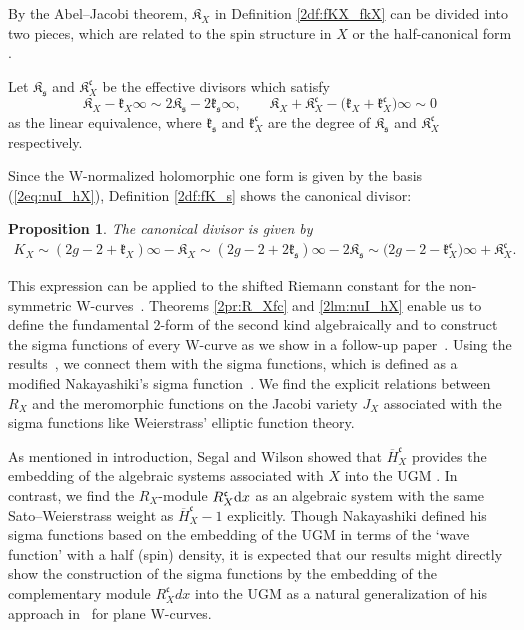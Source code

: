 \documentclass[pdftex]{sigma}
\def\fK{{\mathfrak K}}
\def\fc{{\mathfrak c}}
\def\fk{{\mathfrak k}}
\def\fs{{\mathfrak s}}
\def\BH{{\overline H}}
\numberwithin{equation}{section}
\newtheorem{Proposition}[Theorem]{Proposition}
 { \theoremstyle{definition}
\newtheorem{Definition}[Theorem]{Definition}
\newtheorem{Note}[Theorem]{Note}
\newtheorem{Example}[Theorem]{Example}
\newtheorem{Remark}[Theorem]{Remark} }
\begin{document}
By the Abel--Jacobi theorem, $\fK_X$ in Definition \ref{2df:fKX_fkX} can be divided into two pieces, which are related to the spin structure in $X$ or the half-canonical form \cite{KMP16}.

\begin{Definition}\label{2df:fK_s}
Let $\fK_\fs$ and $\fK_X^\fc$ be the effective divisors which satisfy
\[
\fK_X-\fk_X\infty \sim2\fK_\fs-2 \fk_\fs\infty,\qquad
\fK_X + \fK_X^\fc - \big(\fk_X+\fk_X^\fc\big)\infty\sim 0
\]
as the linear equivalence, where $\fk_\fs$ and $\fk_X^\fc$ are the degree of $\fK_\fs$ and $\fK_X^\fc$ respectively.
\end{Definition}

Since the W-normalized holomorphic one form is given by the basis (\ref{2eq:nuI_hX}), Definition \ref{2df:fK_s} shows the canonical divisor:

\begin{Proposition}\label{2pr:cKX}
The canonical divisor is given by
\begin{gather*}
K_X \sim(2g-2+\fk_X)\infty-\fK_X\sim (2g-2+2\fk_\fs)\infty - 2\fK_\fs
\sim \big(2g-2-\fk_X^\fc\big)\infty +\fK_X^\fc.
\end{gather*}
\end{Proposition}

This expression can be applied to the shifted Riemann constant for the non-symmetric W-curves~\cite{KMP16}.
Theorems \ref{2pr:R_Xfc} and \ref{2lm:nuI_hX} enable us to define the fundamental 2-form of the second kind algebraically and to construct the sigma functions of every W-curve as we show in a follow-up paper~\cite{KMP2022b}.
Using the results~\cite{KMP16}, we connect them with the sigma functions, which is defined as a modified Nakayashiki's sigma function~\cite{KMP2022b}.
We find the explicit relations between $R_X$ and the meromorphic functions
on the Jacobi variety $J_X$ associated with the sigma functions like Weierstrass' elliptic function theory.

As mentioned in introduction, Segal and Wilson showed that $\BH_X^\fc$ provides the embedding of the algebraic systems associated with $X$ into the UGM \cite[p.~46]{SegalWilson}.
In contrast, we find the $R_X$-module $R_X^\fc {\rm d}x$ as an algebraic system with the same Sato--Weierstrass weight as $\BH_X^\fc-1$ explicitly.
Though Nakayashiki defined his sigma functions based on the embedding of the UGM \cite{Nak16} in terms of the {\lq}wave function{\rq} with a half (spin) density, it is expected that our results might directly show the construction of the sigma functions by the embedding of the complementary module $R_X^\fc dx$ into the UGM as a natural generalization of his approach in~\cite{Nak10b} for plane W-curves.
\end{document}
